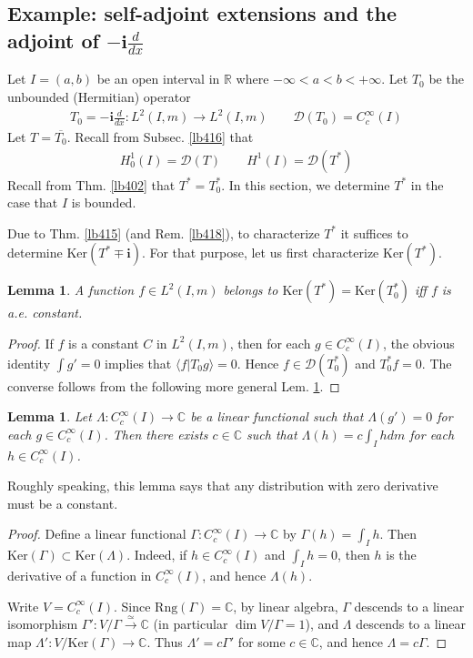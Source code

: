 \documentclass[12pt,b5paper,notitlepage]{article}
\theoremstyle{definition}
\theoremstyle{plain}
\newtheorem{lm}[df]{Lemma}
\newcommand{\ovl}{\overline}
\newcommand{\Dom}{\mathscr{D}}
\newcommand{\bk}[1]{\langle {#1}\rangle}
\newcommand{\im}{\mathbf{i}}
\newcommand{\Cbb}{\mathbb C}
\newcommand{\Rbb}{\mathbb R}
\newcommand{\Ker}{\mathrm{Ker}}
\newcommand{\Rng}{\mathrm{Rng}}
\numberwithin{equation}{section}
\begin{document}
\subsection{Example: self-adjoint extensions and the adjoint of $-\im\frac d{dx}$}\label{lb425}


Let $I=(a,b)$ be an open interval in $\Rbb$ where $-\infty<a<b<+\infty$. Let $T_0$ be the unbounded (Hermitian) operator 
\begin{gather*}
T_0=-\im\frac d{dx}:L^2(I,m)\rightarrow L^2(I,m)\qquad \Dom(T_0)=C_c^\infty(I)
\end{gather*}
Let $T=\ovl{T_0}$. Recall from Subsec. \ref{lb416} that
\begin{align*}
H^1_0(I)=\Dom(T)\qquad H^1(I)=\Dom(T^*)
\end{align*}
Recall from Thm. \ref{lb402} that $T^*=T_0^*$. In this section, we determine $T^*$ in the case that $I$ is bounded.


Due to Thm. \ref{lb415} (and Rem. \ref{lb418}), to characterize $T^*$ it suffices to determine $\Ker(T^*\mp\im)$. For that purpose, let us first characterize $\Ker(T^*)$.

\begin{lm}\label{lb421}
A function $f\in L^2(I,m)$ belongs to $\Ker(T^*)=\Ker(T_0^*)$ iff $f$ is a.e. constant.
\end{lm}



\begin{proof}
If $f$ is a constant $C$ in $L^2(I,m)$, then for each $g\in C_c^\infty(I)$, the obvious identity $\int g'=0$ implies that $\bk{f|T_0g}=0$. Hence $f\in\Dom(T_0^*)$ and $T_0^*f=0$. The converse follows from the following more general Lem. \ref{lb566}.
\end{proof}

\begin{lm}\label{lb566}
Let $\Lambda:C_c^\infty(I)\rightarrow\Cbb$ be a linear functional such that $\Lambda(g')=0$ for each $g\in C_c^\infty(I)$. Then there exists $c\in\Cbb$ such that $\Lambda(h)=c \int_I hdm$ for each $h\in C_c^\infty(I)$.
\end{lm}

Roughly speaking, this lemma says that any distribution with zero derivative must be a constant.


\begin{proof}
Define a linear functional $\Gamma:C_c^\infty(I)\rightarrow\Cbb$ by $\Gamma(h)=\int_I h$. Then $\Ker(\Gamma)\subset\Ker(\Lambda)$. Indeed, if $h\in C_c^\infty(I)$ and $\int_Ih=0$, then $h$ is the derivative of a function in $C_c^\infty(I)$, and hence $\Lambda(h)$.


Write $V=C_c^\infty(I)$. Since $\Rng(\Gamma)=\Cbb$, by linear algebra, $\Gamma$ descends to a linear isomorphism $\Gamma':V/\Gamma\xrightarrow{\simeq}\Cbb$ (in particular $\dim V/\Gamma=1$), and $\Lambda$ descends to a linear map $\Lambda':V/\Ker(\Gamma)\rightarrow\Cbb$. Thus $\Lambda'=c\Gamma'$ for some $c\in\Cbb$, and hence $\Lambda=c\Gamma$.
\end{proof}
\end{document}
